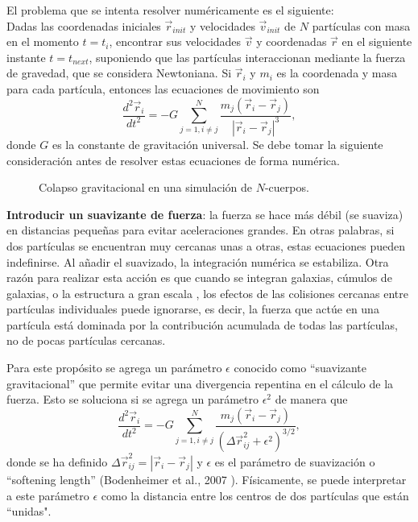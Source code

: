 \documentclass[a4paper,openright,10pt, oneside, final]{book}
\begin{document}
El problema que se intenta resolver numéricamente es el siguiente:\\

Dadas las coordenadas iniciales $\vec{r}_{init}$ y velocidades $\vec{v}_{init}$ de $N$ partículas con masa en el momento $t = t_{i}$, encontrar sus velocidades $\vec{v}$ y coordenadas $\vec{r}$ en el siguiente instante $t = t_{next}$, suponiendo que las partículas interaccionan mediante la fuerza de gravedad, que se considera Newtoniana. Si $\vec{r}_{i}$ y $m_{i}$ es la coordenada y masa para cada partícula, entonces las ecuaciones de movimiento son
\begin{equation}
\frac{d^{2}\vec{r}_{i}}{d t^{2}}=
-G \sum_{j=1, i \not= j}^{N} \frac{m_{j}(\vec{r}_{i}-\vec{r}_{j})}{|\vec{r}_{i}-\vec{r}_{j}|^{3}}, \label{eqn 2.8}
\end{equation}
donde $G$ es la constante de gravitación universal. Se debe tomar la siguiente consideración antes de resolver estas ecuaciones de forma numérica.

\begin{figure}
\centering
{}
\caption{\footnotesize{Colapso gravitacional en una simulación de $N$-cuerpos.}}
\end{figure}

\textbf{Introducir un suavizante de fuerza}: la fuerza se hace más débil (se suaviza) en distancias pequeñas para evitar aceleraciones grandes. En otras palabras, si dos partículas se encuentran muy cercanas unas a otras, estas ecuaciones pueden indefinirse. Al añadir el suavizado, la integración numérica se estabiliza. Otra razón para realizar esta acción es que cuando se integran galaxias, cúmulos de galaxias, o la estructura a gran escala , los efectos de las colisiones cercanas entre partículas individuales puede ignorarse, es decir, la fuerza que actúe en una partícula está dominada por la contribución acumulada de todas las partículas, no de pocas partículas cercanas.

Para este propósito se agrega un parámetro $\epsilon$ conocido como “suavizante gravitacional” que permite evitar una divergencia repentina en el cálculo de la fuerza. Esto se soluciona si se agrega un parámetro $\epsilon^{2}$ de manera que 
\begin{equation}
\frac{d^{2}\vec{r}_{i}}{d t^{2}}=
-G \sum_{j=1, i \not= j}^{N} \frac{m_{j}(\vec{r}_{i}-\vec{r}_{j})}{(\Delta\vec{r}_{ij}^{2} + \epsilon^{2})^{3/2}},\label{eqn2.7}
\end{equation} 
donde se ha definido $\Delta\vec{r}_{ij}^{2} = |\vec{r}_{i} - \vec{r}_{j}|$ y $\epsilon$ es el parámetro de suavización o “softening length” (Bodenheimer et al., 2007 \cite{b5}). Físicamente, se puede interpretar a este parámetro $\epsilon$ como la distancia entre los centros de dos partículas que están “unidas".
\end{document}
